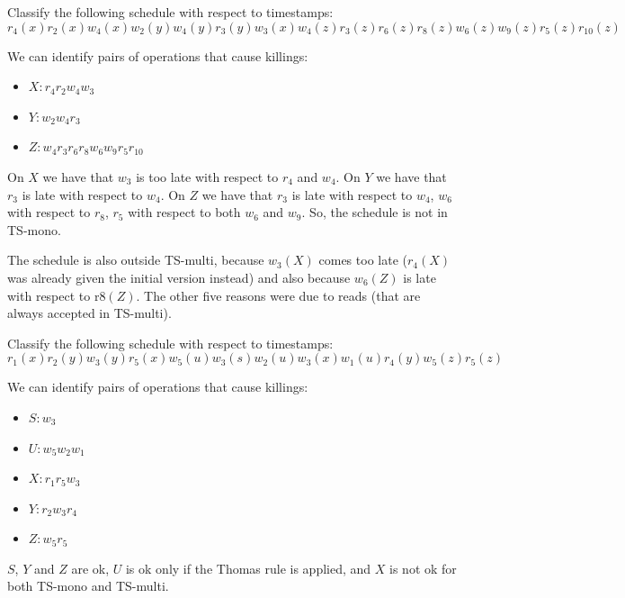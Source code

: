 \documentclass[12pt, a4paper]{report}
\newtheorem[style=M,bodystyle=\normalfont]{theorem}{Theorem}
\newtheorem[style=M,bodystyle=\normalfont]{corollary}{Corollary}
\newtheorem[style=M,bodystyle=\normalfont]{lemma}{Lemma}
\newtheorem[style=M,bodystyle=\normalfont]{definition}{Definition}
\begin{document}
\begin{Exercise}[label=15]
    Classify the following schedule with respect to timestamps: 
    \[r_4(x) r_2(x) w_4(x) w_2(y) w_4(y) r_3(y) w_3(x) w_4(z) r_3(z) r_6(z) r_8(z) w_6(z) w_9(z) r_5(z) r_{10}(z)\]
\end{Exercise}
\begin{Answer}[ref=15]
    We can identify pairs of operations that cause killings:
    \begin{itemize}
        \item $X: r_4 r_2 w_4 w_3$
        \item $Y: w_2 w_4 r_3$
        \item $Z: w_4 r_3 r_6 r_8 w_6 w_9 r_5 r_{10}$
    \end{itemize}
    On $X$ we have that $w_3$ is too late with respect to $r_4$ and $w_4$. On $Y$ we have that $r_3$ is late with respect to $w_4$. On 
    $Z$ we have that $r_3$ is late with respect to $w_4$, $w_6$ with respect to $r_8$, $r_5$ with respect to both $w_6$ and $w_9$. 
    So, the schedule is not in TS-mono. 

    The schedule is also outside TS-multi, because $w_3(X)$ comes too late ($r_4(X)$ was already given the initial version instead) and 
    also because $w_6(Z)$ is late with respect to r$8(Z)$. The other five reasons were due to reads (that are always accepted in TS-multi).
\end{Answer}

\newpage

\begin{Exercise}[label=16]
    Classify the following schedule with respect to timestamps: 
    \[r_1(x) r_2(y) w_3(y) r_5(x) w_5(u) w_3(s) w_2(u) w_3(x) w_1(u) r_4(y) w_5(z) r_5(z)\]
\end{Exercise}
\begin{Answer}[ref=16]
    We can identify pairs of operations that cause killings:
    \begin{itemize}
        \item $S:w_3$
        \item $U:w_5w_2w_1$
        \item $X:r_1r_5w_3$
        \item $Y:r_2w_3r_4$
        \item $Z:w_5r_5$
    \end{itemize}
    $S$, $Y$ and $Z$ are ok, $U$ is ok only if the Thomas rule is applied, and $X$ is not ok for both TS-mono and TS-multi. 

\end{Answer}
\end{document}
